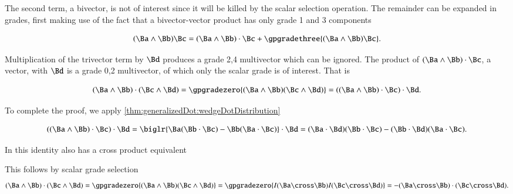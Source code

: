 The second term, a bivector, is not of interest since it will be killed by the scalar selection operation.
The remainder can be expanded in grades, first making use of the fact that a bivector-vector product has only
grade 1 and 3 components

\begin{dmath}\label{eqn:generalizedDot:1180}
(\Ba \wedge \Bb) \Bc
=
(\Ba \wedge \Bb) \cdot \Bc
+ \gpgradethree{ (\Ba \wedge \Bb) \Bc }.
\end{dmath}

Multiplication of the trivector term by \( \Bd \) produces a grade 2,4 multivector which can be ignored.
The product
of \( (\Ba \wedge \Bb) \cdot \Bc \), a vector, with \( \Bd \) is a grade 0,2 multivector, of which only the scalar grade is of interest.
That is

\begin{dmath}\label{eqn:generalizedDot:1220}
(\Ba \wedge \Bb) \cdot (\Bc \wedge \Bd)
= \gpgradezero{ (\Ba \wedge \Bb) (\Bc \wedge \Bd) }
=
((\Ba \wedge \Bb) \cdot \Bc )\cdot \Bd.
\end{dmath}

To complete the proof, we apply \cref{thm:generalizedDot:wedgeDotDistribution}

\begin{dmath}\label{eqn:generalizedDot:1240}
((\Ba \wedge \Bb) \cdot \Bc )\cdot \Bd
=
\biglr{ \Ba (\Bb \cdot \Bc) - \Bb (\Ba \cdot \Bc) } \cdot \Bd
=
(\Ba \cdot \Bd) (\Bb \cdot \Bc) - (\Bb \cdot \Bd) (\Ba \cdot \Bc).
\end{dmath}

In  this identity also has a cross product equivalent


This follows by scalar grade selection
\begin{dmath}\label{eqn:generalizedDot:1140}
(\Ba \wedge \Bb) \cdot (\Bc \wedge \Bd)
=
\gpgradezero{
(\Ba \wedge \Bb) (\Bc \wedge \Bd)
}
=
\gpgradezero{
I (\Ba \cross \Bb) I (\Bc \cross \Bd)
}
=
-(\Ba \cross \Bb) \cdot (\Bc \cross \Bd).
\end{dmath}

